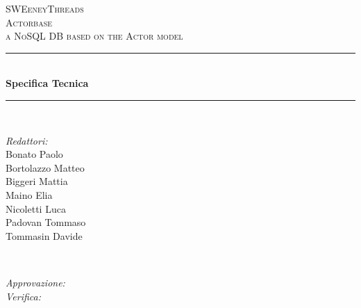 \documentclass[a4paper]{article}
\begin{document}
	
	\begin{titlepage}
		\newcommand{\HRule}{\rule{\linewidth}{0.5mm}} 
		\center  
		
		\textsc{\LARGE SWEeneyThreads}\\[1.5cm] 
		\textsc{\Large Actorbase}\\[0.5cm] 
		\textsc{\large a NoSQL DB based on the Actor model}\\[0.5cm]
		
		
		\HRule \\[0.4cm]
		{ \huge \bfseries Specifica Tecnica}\\[0.4cm] 
		\HRule \\[1.5cm]
		
		\begin{minipage}{0.4\textwidth}
			\begin{flushleft} \large
				\emph{Redattori:}\\
				Bonato Paolo \\
				Bortolazzo Matteo \\
				Biggeri Mattia \\
				Maino Elia \\
				Nicoletti Luca  \\
				Padovan Tommaso \\
				Tommasin Davide
			\end{flushleft}
		\end{minipage}
		~
		\begin{minipage}{0.4\textwidth}
			\begin{flushright} \large
				\emph{Approvazione:} \\
				\emph{Verifica:} \\
				 
			\end{flushright}
		\end{minipage}
		

\end{titlepage}
\end{document}

